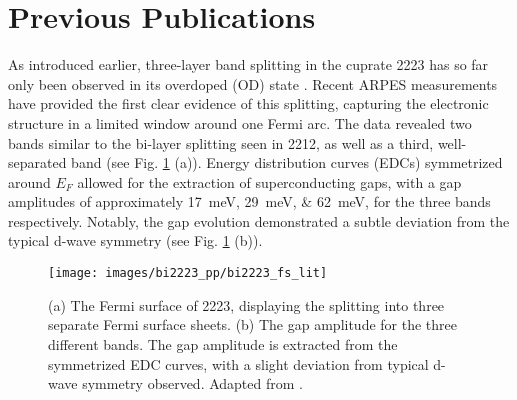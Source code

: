 \section{Previous Publications}

As introduced earlier, three-layer band splitting in the cuprate 2223 has so far only been observed in its overdoped (OD) state \cite{luo_electronic_2023}.
Recent ARPES measurements have provided the first clear evidence of this splitting, capturing the electronic structure in a limited window around one Fermi arc.
The data revealed two bands similar to the bi-layer splitting seen in 2212, as well as a third, well-separated band (see Fig. \ref{fig:bi2223_fs_lit} (a)).
Energy distribution curves (EDCs) symmetrized around $E_F$ allowed for the extraction of superconducting gaps, with a gap amplitudes of approximately \qtylist{17;29;62}{\milli\electronvolt}, for the three bands respectively.
Notably, the gap evolution demonstrated a subtle deviation from the typical d-wave symmetry (see Fig. \ref{fig:bi2223_fs_lit} (b)).

\begin{figure}[t]
	\centering
	\texttt{[image: images/bi2223\_pp/bi2223\_fs\_lit]}
	\caption{(a) The Fermi surface of 2223, displaying the splitting into three separate Fermi surface sheets. (b) The gap amplitude for the three different bands. The gap amplitude is extracted from the symmetrized EDC curves, with a slight deviation from typical d-wave symmetry observed. Adapted from \cite{luo_electronic_2023}.}
	\label{fig:bi2223_fs_lit}
\end{figure}



